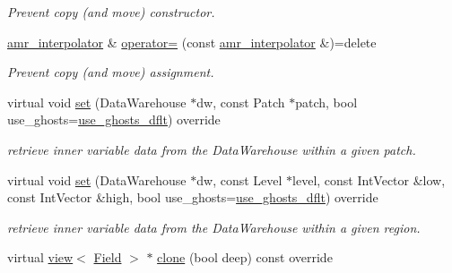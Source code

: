 \begin{DoxyCompactItemize}
\begin{DoxyCompactList}\small\item\em Prevent copy (and move) constructor. \end{DoxyCompactList}\item 
\hyperlink{classUintah_1_1PhaseField_1_1detail_1_1amr__interpolator}{amr\+\_\+interpolator} \& \hyperlink{classUintah_1_1PhaseField_1_1detail_1_1amr__interpolator_3_01ScalarField_3_01T_01_4_00_01Problem64f2458f98b03e27672a091eecc4b696_a728951556ec6db508959f5841d2f2141}{operator=} (const \hyperlink{classUintah_1_1PhaseField_1_1detail_1_1amr__interpolator}{amr\+\_\+interpolator} \&)=delete
\begin{DoxyCompactList}\small\item\em Prevent copy (and move) assignment. \end{DoxyCompactList}\item 
virtual void \hyperlink{classUintah_1_1PhaseField_1_1detail_1_1amr__interpolator_3_01ScalarField_3_01T_01_4_00_01Problem64f2458f98b03e27672a091eecc4b696_a75df9007f3338551abf056c9c2c32aad}{set} (Data\+Warehouse $\ast$dw, const Patch $\ast$patch, bool use\+\_\+ghosts=\hyperlink{classUintah_1_1PhaseField_1_1detail_1_1amr__interpolator_3_01ScalarField_3_01T_01_4_00_01Problem64f2458f98b03e27672a091eecc4b696_a659b258bc11df07830b73859f57dee78}{use\+\_\+ghosts\+\_\+dflt}) override
\begin{DoxyCompactList}\small\item\em retrieve inner variable data from the Data\+Warehouse within a given patch. \end{DoxyCompactList}\item 
virtual void \hyperlink{classUintah_1_1PhaseField_1_1detail_1_1amr__interpolator_3_01ScalarField_3_01T_01_4_00_01Problem64f2458f98b03e27672a091eecc4b696_a2b548da6a4fc9626172b906a6a1a7d57}{set} (Data\+Warehouse $\ast$dw, const Level $\ast$level, const Int\+Vector \&low, const Int\+Vector \&high, bool use\+\_\+ghosts=\hyperlink{classUintah_1_1PhaseField_1_1detail_1_1amr__interpolator_3_01ScalarField_3_01T_01_4_00_01Problem64f2458f98b03e27672a091eecc4b696_a659b258bc11df07830b73859f57dee78}{use\+\_\+ghosts\+\_\+dflt}) override
\begin{DoxyCompactList}\small\item\em retrieve inner variable data from the Data\+Warehouse within a given region. \end{DoxyCompactList}\item 
virtual \hyperlink{classUintah_1_1PhaseField_1_1detail_1_1view}{view}$<$ \hyperlink{structUintah_1_1PhaseField_1_1ScalarField}{Field} $>$ $\ast$ \hyperlink{classUintah_1_1PhaseField_1_1detail_1_1amr__interpolator_3_01ScalarField_3_01T_01_4_00_01Problem64f2458f98b03e27672a091eecc4b696_a6bdc935e6a1d72f8437cbe1b37dcb12c}{clone} (bool deep) const override

\end{DoxyCompactItemize}
